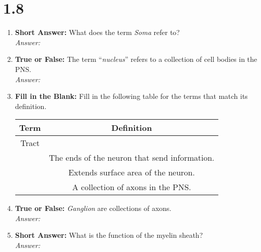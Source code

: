 \section*{1.8 \squigglyline}
\begin{enumerate}[label=\textbf{Q1.8.\arabic*}]

      \item \textbf{Short Answer:} What does the term \textit{Soma} refer to? \\
            \textit{Answer:}%

      \item \textbf{True or False:} The term ``\textit{nucleus}'' refers to a collection of cell bodies in the PNS. \\
            \textit{Answer:} %

      \item \textbf{Fill in the Blank:} Fill in the following table for the terms that match its definition. \\

            \begin{tabular}[htbp]{cc}
                  \toprule
                  \textbf{Term}            & \textbf{Definition}                           \\ \midrule
                  Tract                    & \underline{\hspace{10cm}}                     \\[0.5em]
                  \underline{\hspace{3cm}} & The ends of the neuron that send information. \\[0.5em]
                  \underline{\hspace{3cm}} & Extends surface area of the neuron.           \\[0.5em]
                  \underline{\hspace{3cm}} & A collection of axons in the PNS.             \\        \bottomrule
            \end{tabular}

      \item \textbf{True or False:} \textit{Ganglion} are collections of axons. \\
            \textit{Answer:} %

      \item \textbf{Short Answer:} What is the function of the myelin sheath? \\
            \textit{Answer:} %
\end{enumerate}

